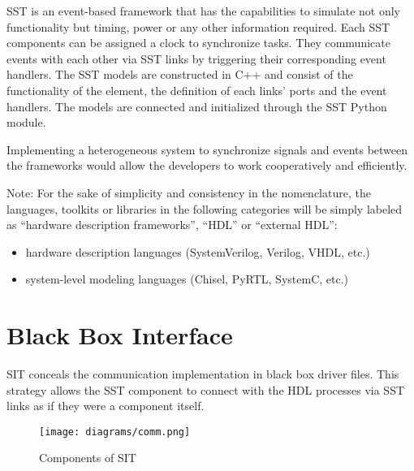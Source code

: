 \documentclass{article}
\begin{document}
  SST is an event-based framework that has the capabilities to simulate not only functionality but
  timing, power or any other information required. Each SST components can be assigned a clock to
  synchronize tasks. They communicate events with each other via SST links by triggering their
  corresponding event handlers. The SST models are constructed in C++ and consist of the
  functionality of the element, the definition of each links' ports and the event handlers. The
  models are connected and initialized through the SST Python module.


  Implementing a heterogeneous system to synchronize signals and events between the frameworks would
  allow the developers to work cooperatively and efficiently.


  Note: For the sake of simplicity and consistency in the nomenclature, the languages, toolkits or
  libraries in the following categories will be simply labeled as ``hardware description
  frameworks'', ``HDL'' or ``external HDL'':
  \begin{itemize}
    \item hardware description languages (SystemVerilog, Verilog, VHDL, etc.)
    \item system-level modeling languages (Chisel, PyRTL, SystemC, etc.)
  \end{itemize}

  \section{Black Box Interface}
  SIT conceals the communication implementation in black box driver files. This strategy allows the
  SST component to connect with the HDL processes via SST links as if they were a component itself.

  \begin{figure}[!h]
    \centering
    \texttt{[image: diagrams/comm.png]}
    \caption{Components of SIT}
    \label{fig:comm}
  \end{figure}
\end{document}
